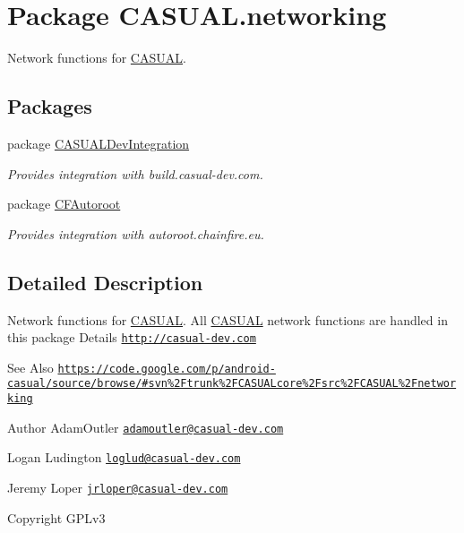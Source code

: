 \hypertarget{namespace_c_a_s_u_a_l_1_1networking}{\section{Package C\-A\-S\-U\-A\-L.\-networking}
\label{namespace_c_a_s_u_a_l_1_1networking}
}


Network functions for \hyperlink{namespace_c_a_s_u_a_l}{C\-A\-S\-U\-A\-L}.  


\subsection*{Packages}
\begin{DoxyCompactItemize}
\item 
package \hyperlink{namespace_c_a_s_u_a_l_1_1networking_1_1_c_a_s_u_a_l_dev_integration}{C\-A\-S\-U\-A\-L\-Dev\-Integration}
\begin{DoxyCompactList}\small\item\em Provides integration with build.\-casual-\/dev.\-com. \end{DoxyCompactList}\item 
package \hyperlink{namespace_c_a_s_u_a_l_1_1networking_1_1_c_f_autoroot}{C\-F\-Autoroot}
\begin{DoxyCompactList}\small\item\em Provides integration with autoroot.\-chainfire.\-eu. \end{DoxyCompactList}\end{DoxyCompactItemize}


\subsection{Detailed Description}
Network functions for \hyperlink{namespace_c_a_s_u_a_l}{C\-A\-S\-U\-A\-L}. All \hyperlink{namespace_c_a_s_u_a_l}{C\-A\-S\-U\-A\-L} network functions are handled in this package Details \href{http://casual-dev.com}{\tt http\-://casual-\/dev.\-com} \begin{DoxySeeAlso}{See Also}
\href{https://code.google.com/p/android-casual/source/browse/#svn%2Ftrunk%2FCASUALcore%2Fsrc%2FCASUAL%2Fnetworking}{\tt https\-://code.\-google.\-com/p/android-\/casual/source/browse/\#svn\%2\-Ftrunk\%2\-F\-C\-A\-S\-U\-A\-Lcore\%2\-Fsrc\%2\-F\-C\-A\-S\-U\-A\-L\%2\-Fnetworking} 
\end{DoxySeeAlso}
\begin{DoxyAuthor}{Author}
Adam\-Outler \href{mailto:adamoutler@casual-dev.com}{\tt adamoutler@casual-\/dev.\-com} 

Logan Ludington \href{mailto:loglud@casual-dev.com}{\tt loglud@casual-\/dev.\-com} 

Jeremy Loper \href{mailto:jrloper@casual-dev.com}{\tt jrloper@casual-\/dev.\-com} 
\end{DoxyAuthor}
\begin{DoxyCopyright}{Copyright}
G\-P\-Lv3 
\end{DoxyCopyright}
